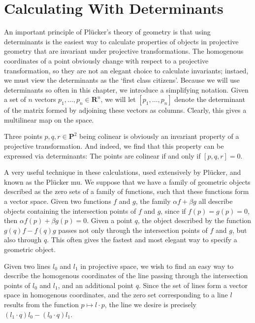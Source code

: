 \section{Calculating With Determinants}

An important principle of Pl\"{u}cker's theory of geometry is that using determinants is the easiest way to calculate properties of objects in projective geometry that are invariant under projective transformations. The homogenous coordinates of a point obviously change with respect to a projective transformation, so they are not an elegant choice to calculate invariants; instaed, we must view the determinants as the `first class citizens'. Because we will use determinants so often in this chapter, we introduce a simplifying notation. Given a set of $n$ vectors $p_1, \dots, p_n \in \mathbf{R}^n$, we will let $[p_1, \dots, p_n]$ denote the determinant of the matrix formed by adjoining these vectors as columns. Clearly, this gives a multilinear map on the space.

\begin{example}
    Three points $p,q,r \in \mathbf{P}^2$ being colinear is obviously an invariant property of a projective transformation. And indeed, we find that this property can be expressed via determinants: The points are colinear if and only if $[p,q,r] = 0$.
\end{example}

A very useful technique in these calculations, used extensively by Pl\"{u}cker, and known as the Pl\"{u}cker mu. We suppose that we have a family of geometric objects described as the zero sets of a family of functions, such that these functions form a vector space. Given two functions $f$ and $g$, the family $\alpha f + \beta g$ all describe objects containing the intersection points of $f$ and $g$, since if $f(p) = g(p) = 0$, then $\alpha f(p) + \beta g(p) = 0$. Given a point $q$, the object described by the function $g(q) f - f(q) g$ passes not only through the intersection points of $f$ and $g$, but also through $q$. This often gives the fastest and most elegant way to specify a geometric object.

\begin{example}
    Given two lines $l_0$ and $l_1$ in projective space, we wish to find an easy way to describe the homogenous coordinates of the line passing through the intersection points of $l_0$ and $l_1$, and an additional point $q$. Since the set of lines form a vector space in homogenous coordinates, and the zero set corresponding to a line $l$ results from the function $p \mapsto l \cdot p$, the line we desire is precisely $(l_1 \cdot q) l_0 - (l_0 \cdot q) l_1$.
\end{example}

